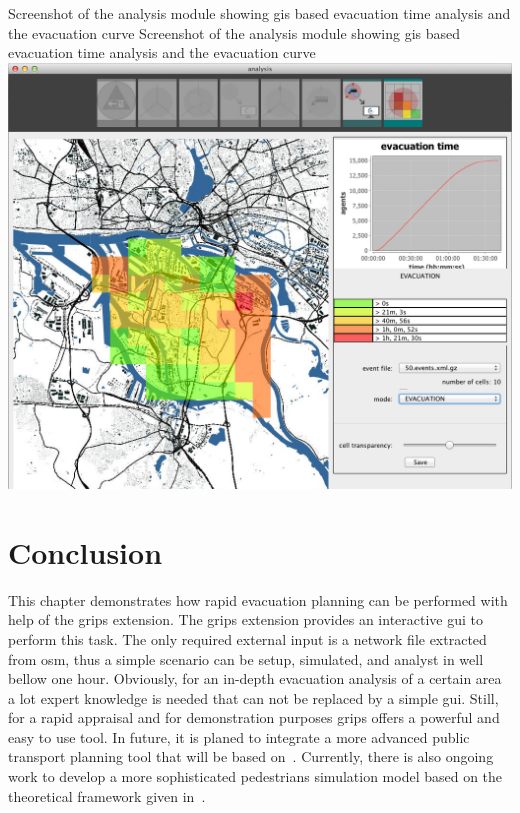 \createfigure%
{Screenshot of the analysis module showing \gls{gis} based evacuation time analysis and the evacuation curve}%
{Screenshot of the analysis module showing \gls{gis} based evacuation time analysis and the evacuation curve}%
{\label{chap:evac:fig:analysis}}%
{\includegraphics[width=1\textwidth]{extending/figures/Evacuation/it50_evac_time}}
{}

\section{Conclusion}
\label{grips:outlook}
This chapter demonstrates how rapid evacuation planning can be performed with help of the \gls{grips} extension. The \gls{grips} extension provides an interactive \gls{gui} to perform this task.
The only required external input is a network file extracted from \gls{osm}, thus a simple scenario can be setup, simulated, and analyst in well bellow one hour. Obviously, for an in-depth evacuation analysis of a certain area a lot expert knowledge is needed that can not be replaced by a simple \gls{gui}. Still, for a rapid appraisal and for demonstration purposes \gls{grips} offers a powerful and easy to use tool. In future, it is planed to integrate a more advanced public transport planning tool that will be based on~\citet{Neumann_PhDThesis_2014}. Currently, there is also ongoing work to develop a more sophisticated pedestrians simulation model based on the theoretical framework given in~\citet{FloetteroedLaemmel2014BiPedFnd}.

